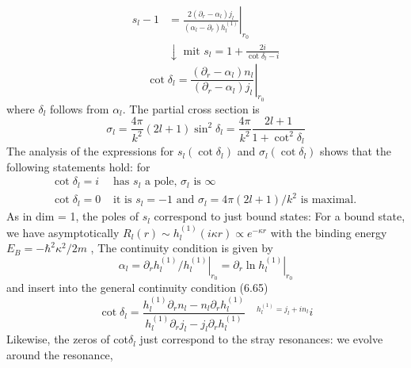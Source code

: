\begin{equation}
\begin{aligned} s_{l}-1 &=\left.\frac{2\left(\partial_{r}-\alpha_{l}\right) j_{l}}{\left(\alpha_{l}-\partial_{r}\right) h_{l}^{(1)}}\right|_{r_{0}} \\ & \downarrow \text { mit } s_{l}=1+\frac{2 i}{\cot \delta_{l}-i} \end{aligned}
\end{equation}
\begin{equation}
    \cot \delta_{l}=\left.\frac{\left(\partial_{r}-\alpha_{l}\right) n_{l}}{\left(\partial_{r}-\alpha_{l}\right) j_{l}}\right|_{r_{0}}
    \end{equation}
where $\delta_l$ follows from $\alpha_l$. The partial cross section is
\begin{equation}
    \sigma_{l}=\frac{4 \pi}{k^{2}}(2 l+1) \sin ^{2} \delta_{l}=\frac{4 \pi}{k^{2}} \frac{2 l+1}{1+\cot ^{2} \delta_{l}}
    \end{equation}
The analysis of the expressions for $s_l(\operatorname{cot} \delta_l)$ and $\sigma_l (\operatorname{cot}\delta_l)$ shows that the following statements hold: for
\begin{equation}
\begin{array}{ll}{\cot \delta_{l}=i} & {\text { has } s_{l} \text { a pole, } \sigma_{l} \text { is } \infty} \\ 
{\cot \delta_{l}=0} & {  \text { it is } s_{l}=-1 \text { and } \sigma_{l}=4 \pi(2 l+1) / k^{2} \text { is maximal. }}\end{array}
\end{equation}
As in dim = 1, the poles of $s_l$ correspond to just bound states: For a bound state, we have asymptotically $R_l(r)\sim h_l^{(1)}(i\kappa r)\propto e^{-\kappa r}$ with the binding energy $E_B = - \hbar^2\kappa^2 / 2m$ , The continuity condition is given by
\begin{equation}
    \alpha_{l}=\partial_{r} h_{l}^{(1)} /\left.h_{l}^{(1)}\right|_{r_{0}}=\left.\partial_{r} \ln h_{l}^{(1)}\right|_{r_{0}}
    \end{equation}
and insert into the general continuity condition (6.65)
\begin{equation}
    \cot \delta_{l}=\frac{h_{l}^{(1)} \partial_{r} n_{l}-n_{l} \partial_{r} h_{l}^{(1)}}{h_{l}^{(1)} \partial_{r} j_{l}-j_{l} \partial_{r} h_{l}^{(1)}} \quad^{h_{l}^{(1)}=j_{l}+i n_{l}} i
    \end{equation}
Likewise, the zeros of cot$\delta_l$ just correspond to the stray resonances: we evolve around the resonance,

